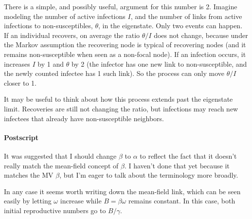 \documentclass[12pt]{article}
\begin{document}
There is a simple, and possibly useful, argument for this number is 2. Imagine modeling the number of active infections $I$, and the number of links from active infections to non-susceptibles, $\theta$, in the eigenstate. Only two events can happen. If an individual recovers, on average the ratio $\theta/I$ does not change, because under the Markov assumption the recovering node is typical of recovering nodes (and it remains non-susceptible when seen as a non-focal node). If an infection occurs, it increases $I$ by 1 and $\theta$ by 2 (the infector has one new link to non-susceptible, and the newly counted infectee has 1 such link). So the process can only move $\theta/I$ closer to 1.

It may be useful to think about how this process extends past the eigenstate limit. Recoveries are still not changing the ratio, but infections may reach new infectees that already have non-susceptible neighbors.

\paragraph*{Postscript} It was suggested that I should change $\beta$ to $\alpha$ to reflect the fact that it doesn't really match the mean-field concept of $\beta$. I haven't done that yet because it matches the MV $\beta$, but I'm eager to talk about the terminology more broadly.

In any case it seems worth writing down the mean-field link, which can be seen easily by letting $\omega$ increase while $B=\beta\omega$ remains constant. In this case, both initial reproductive numbers go to $B/\gamma$.
\end{document}
